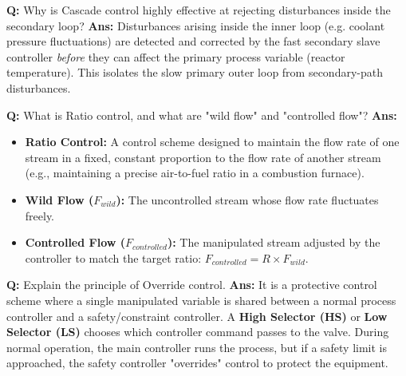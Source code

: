 \documentclass[10pt,a4paper,twocolumn]{article}
\begin{document}
\begin{tcolorbox}[
  colback=white,
  colframe=UnitColorFour,
  colbacktitle=gray!10!white,
  coltitle=black,
  fonttitle=\bfseries\sffamily\small,
  title={Unit IV $\bullet$ Card 4: Cascade Control Advantages},
  boxrule=1.2pt,
  arc=2mm,
  outer arc=2mm,
  boxsep=1.5mm,
  top=1mm,
  bottom=1mm,
  left=1.5mm,
  right=1.5mm,
  before skip=2.5mm,
  after skip=2.5mm
]
\textbf{Q:} Why is Cascade control highly effective at rejecting disturbances inside the secondary loop?
\tcbline
\textbf{Ans:} Disturbances arising inside the inner loop (e.g. coolant pressure fluctuations) are detected and corrected by the fast secondary slave controller \textit{before} they can affect the primary process variable (reactor temperature). This isolates the slow primary outer loop from secondary-path disturbances.
\end{tcolorbox}


\begin{tcolorbox}[
  colback=white,
  colframe=UnitColorFour,
  colbacktitle=gray!10!white,
  coltitle=black,
  fonttitle=\bfseries\sffamily\small,
  title={Unit IV $\bullet$ Card 5: Ratio Control},
  boxrule=1.2pt,
  arc=2mm,
  outer arc=2mm,
  boxsep=1.5mm,
  top=1mm,
  bottom=1mm,
  left=1.5mm,
  right=1.5mm,
  before skip=2.5mm,
  after skip=2.5mm
]
\textbf{Q:} What is Ratio control, and what are "wild flow" and "controlled flow"?
\tcbline
\textbf{Ans:} \begin{itemize}
  \item   \textbf{Ratio Control:} A control scheme designed to maintain the flow rate of one stream in a fixed, constant proportion to the flow rate of another stream (e.g., maintaining a precise air-to-fuel ratio in a combustion furnace).
  \item   \textbf{Wild Flow ($F_{wild}$):} The uncontrolled stream whose flow rate fluctuates freely.
  \item   \textbf{Controlled Flow ($F_{controlled}$):} The manipulated stream adjusted by the controller to match the target ratio: $F_{controlled} = R \times F_{wild}$.
\end{itemize}
\end{tcolorbox}


\begin{tcolorbox}[
  colback=white,
  colframe=UnitColorFour,
  colbacktitle=gray!10!white,
  coltitle=black,
  fonttitle=\bfseries\sffamily\small,
  title={Unit IV $\bullet$ Card 6: Override (Selective) Control},
  boxrule=1.2pt,
  arc=2mm,
  outer arc=2mm,
  boxsep=1.5mm,
  top=1mm,
  bottom=1mm,
  left=1.5mm,
  right=1.5mm,
  before skip=2.5mm,
  after skip=2.5mm
]
\textbf{Q:} Explain the principle of Override control.
\tcbline
\textbf{Ans:} It is a protective control scheme where a single manipulated variable is shared between a normal process controller and a safety/constraint controller. A \textbf{High Selector (HS)} or \textbf{Low Selector (LS)} chooses which controller command passes to the valve. During normal operation, the main controller runs the process, but if a safety limit is approached, the safety controller "overrides" control to protect the equipment.
\end{tcolorbox}
\end{document}
